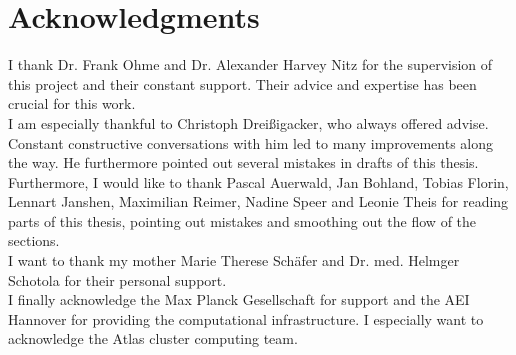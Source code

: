 \section{Acknowledgments}
I thank Dr. Frank Ohme and Dr. Alexander Harvey Nitz for the supervision of this project and their constant support. Their advice and expertise has been crucial for this work.\\
I am especially thankful to Christoph Dreißigacker, who always offered advise. Constant constructive conversations with him led to many improvements along the way. He furthermore pointed out several mistakes in drafts of this thesis.\\
Furthermore, I would like to thank Pascal Auerwald, Jan Bohland, Tobias Florin, Lennart Janshen, Maximilian Reimer, Nadine Speer and Leonie Theis for reading parts of this thesis, pointing out mistakes and smoothing out the flow of the sections.\\
I want to thank my mother Marie Therese Schäfer and Dr. med. Helmger Schotola for their personal support.\\
I finally acknowledge the Max Planck Gesellschaft for support and the AEI Hannover for providing the computational infrastructure. I especially want to acknowledge the Atlas cluster computing team.
\newpage
$\ $
\newpage